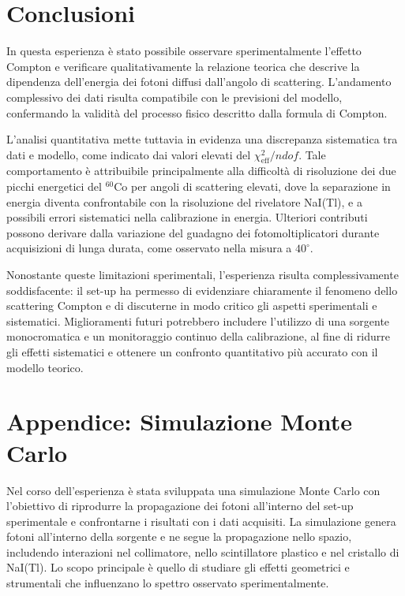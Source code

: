 \documentclass[10pt,twocolumn]{article}
\begin{document}
\section{Conclusioni}
In questa esperienza è stato possibile osservare sperimentalmente l’effetto Compton e verificare qualitativamente la relazione teorica che descrive la dipendenza dell’energia dei fotoni diffusi dall’angolo di scattering. L’andamento complessivo dei dati risulta compatibile con le previsioni del modello, confermando la validità del processo fisico descritto dalla formula di Compton.

L’analisi quantitativa mette tuttavia in evidenza una discrepanza sistematica tra dati e modello, come indicato dai valori elevati del $\chi^2_{\text{eff}}/ndof$. Tale comportamento è attribuibile principalmente alla difficoltà di risoluzione dei due picchi energetici del $^{60}$Co per angoli di scattering elevati, dove la separazione in energia diventa confrontabile con la risoluzione del rivelatore NaI(Tl), e a possibili errori sistematici nella calibrazione in energia. Ulteriori contributi possono derivare dalla variazione del guadagno dei fotomoltiplicatori durante acquisizioni di lunga durata, come osservato nella misura a $40^\circ$.

Nonostante queste limitazioni sperimentali, l’esperienza risulta complessivamente soddisfacente: il set-up ha permesso di evidenziare chiaramente il fenomeno dello scattering Compton e di discuterne in modo critico gli aspetti sperimentali e sistematici. Miglioramenti futuri potrebbero includere l’utilizzo di una sorgente monocromatica e un monitoraggio continuo della calibrazione, al fine di ridurre gli effetti sistematici e ottenere un confronto quantitativo più accurato con il modello teorico.

\onecolumn
\appendix
\section{Appendice: Simulazione Monte Carlo}
\label{app:MC}

Nel corso dell’esperienza è stata sviluppata una simulazione Monte Carlo con l’obiettivo di riprodurre la propagazione dei fotoni all’interno del set-up sperimentale e confrontarne i risultati con i dati acquisiti. La simulazione genera fotoni all’interno della sorgente e ne segue la propagazione nello spazio, includendo interazioni nel collimatore, nello scintillatore plastico e nel cristallo di NaI(Tl). Lo scopo principale è quello di studiare gli effetti geometrici e strumentali che influenzano lo spettro osservato sperimentalmente.
\end{document}
